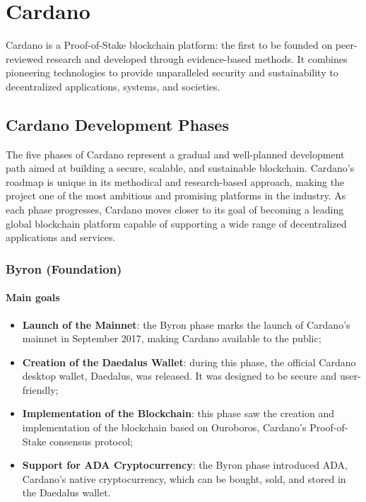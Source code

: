 \chapter{Cardano}

Cardano is a \gls{Proof-of-Stake} blockchain platform: the first 
to be founded on peer-reviewed research and developed through 
evidence-based methods. It combines pioneering technologies 
to provide unparalleled security and sustainability to decentralized 
applications, systems, and societies.

\section{Cardano Development Phases}

The five phases of Cardano represent a gradual and well-planned development 
path aimed at building a secure, scalable, and sustainable blockchain. 
Cardano's roadmap is unique in its methodical and research-based approach, 
making the project one of the most ambitious and promising platforms in the 
industry. As each phase progresses, Cardano moves closer to its goal of 
becoming a leading global blockchain platform capable of supporting a wide 
range of decentralized applications and services.

\vspace{0.5cm}

\subsection{Byron (Foundation)}

\subsubsection*{Main goals}
\begin{itemize}
    \item \textbf{Launch of the Mainnet}: the Byron phase marks the launch of 
        Cardano's mainnet in September 2017, making Cardano available 
        to the public;
    \item \textbf{Creation of the Daedalus Wallet}: during this phase, the 
        official Cardano desktop wallet, Daedalus, was released. It was 
        designed to be secure and user-friendly;

    \item \textbf{Implementation of the Blockchain}: this phase saw the 
        creation and implementation of the blockchain based on Ouroboros, 
        Cardano's Proof-of-Stake consensus protocol;

    \item \textbf{Support for ADA Cryptocurrency}: the Byron phase introduced 
        ADA, Cardano's native cryptocurrency, which can be bought, sold, and 
        stored in the Daedalus wallet.
\end{itemize}

